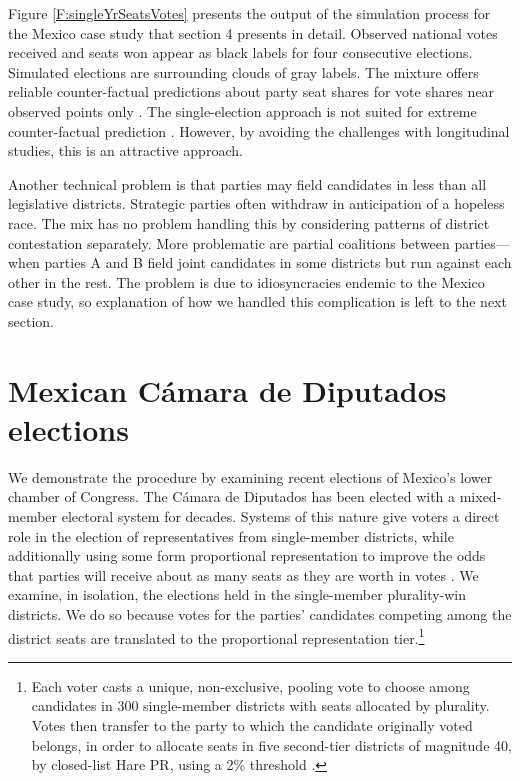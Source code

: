 \documentclass[letter,12pt]{article}
\begin{document}
Figure \ref{F:singleYrSeatsVotes} presents the output of the simulation process for the Mexico case study that section 4 presents in detail. Observed national votes received and seats won appear as black labels for four consecutive elections. Simulated elections are surrounding clouds of gray labels. The mixture offers reliable counter-factual predictions about party seat shares for vote shares near observed points only \citep[about $\pm5$ percent,][:fn.\ 8]{linzerSeatVoteElasticity2012}. The single-election approach is not suited for extreme counter-factual prediction \citep[something generally true for any approach,][]{gelman.king.1994EvalElSysRedis}. However, by avoiding the challenges with longitudinal studies, this is an attractive approach.


Another technical problem is that parties may field candidates in less than all legislative districts. Strategic parties often withdraw in anticipation of a hopeless race. The mix has no problem handling this by considering patterns of district contestation separately. More problematic are partial coalitions between parties---when parties A and B field joint candidates in some districts but run against each other in the rest. The problem is due to idiosyncracies endemic to the Mexico case study, so explanation of how we handled this complication is left to the next section. 

\section{Mexican C\'amara de Diputados elections}


We demonstrate the procedure by examining recent elections of Mexico's lower chamber of Congress. The C\'amara de Diputados has been elected with a mixed-member electoral system for decades. Systems of this nature give voters a direct role in the election of representatives from single-member districts, while additionally using some form proportional representation to improve the odds that parties will receive about as many seats as they are worth in votes \citep{shugart.wattenbergIntro2001}. We examine, in isolation, the elections held in the single-member plurality-win districts. We do so because votes for the parties' candidates competing among the district seats are translated to the proportional representation tier.\footnote{Each voter casts a unique, non-exclusive, pooling vote to choose among candidates in 300 single-member districts with seats allocated by plurality. Votes then transfer to the party to which the candidate originally voted belongs, in order to allocate seats in five second-tier districts of magnitude 40, by closed-list Hare PR, using a 2\% threshold \citep{weldonMixedMemberSys2001}.}
\end{document}
